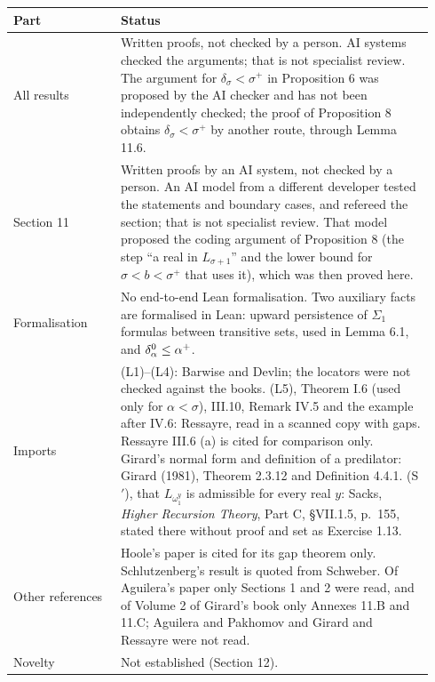 \documentclass[11pt]{article}
\begin{document}
\begin{center}\begin{tabular}{p{0.24\linewidth}p{0.70\linewidth}}
\toprule
Part & Status \\
\midrule
All results & Written proofs, not checked by a person. AI systems checked the arguments;
that is not specialist review. The argument for $\delta_{\sigma} < \sigma^+$ in Proposition 6 was proposed by the AI
checker and has not been independently checked; the proof of Proposition 8 obtains
$\delta_{\sigma} < \sigma^+$ by another route, through Lemma 11.6. \\
Section 11 & Written proofs by an AI system, not checked by a person. An AI model from a different developer tested
the statements and boundary cases, and refereed the section; that is not specialist review. That model proposed
the coding argument of Proposition 8 (the step ``a real in $L_{\sigma+1}$'' and the lower bound for
$\sigma < b < \sigma^+$ that uses it), which was then proved here. \\
Formalisation & No end-to-end Lean formalisation. Two auxiliary facts are formalised in Lean: upward persistence of
$\Sigma_1$ formulas between transitive sets, used in Lemma 6.1, and $\delta^0_{\alpha} \le \alpha^+$. \\
Imports & (L1)--(L4): Barwise and Devlin; the locators were not checked against the books. (L5), Theorem I.6
(used only for $\alpha < \sigma$), III.10, Remark IV.5 and the example after IV.6: Ressayre, read in a scanned copy
with gaps. Ressayre III.6 (a) is cited for comparison only. Girard's normal form and definition of a predilator: Girard (1981), Theorem 2.3.12 and
Definition 4.4.1. (S$'$), that $L_{\omega_1^y}$ is admissible for every real $y$: Sacks, \emph{Higher Recursion Theory},
Part C, \S VII.1.5, p.~155, stated there without proof and set as Exercise 1.13. \\
Other references & Hoole's paper is cited for its gap theorem only. Schlutzenberg's result is quoted from Schweber.
Of Aguilera's paper only Sections 1 and 2 were read, and of Volume 2 of Girard's book only Annexes 11.B and 11.C;
Aguilera and Pakhomov and Girard and Ressayre were not read. \\
Novelty & Not established (Section 12). \\
\bottomrule
\end{tabular}\end{center}
\end{document}
